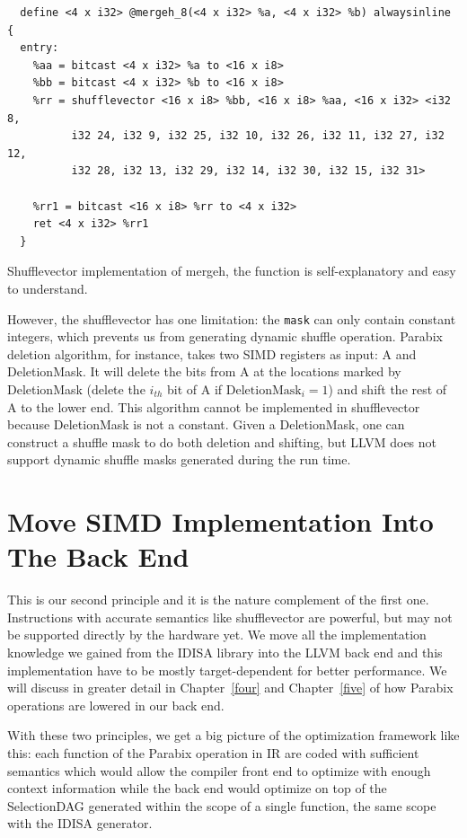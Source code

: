 \begin{program}
\begin{verbatim}
  define <4 x i32> @mergeh_8(<4 x i32> %a, <4 x i32> %b) alwaysinline {
  entry:
    %aa = bitcast <4 x i32> %a to <16 x i8>
    %bb = bitcast <4 x i32> %b to <16 x i8>
    %rr = shufflevector <16 x i8> %bb, <16 x i8> %aa, <16 x i32> <i32 8,
          i32 24, i32 9, i32 25, i32 10, i32 26, i32 11, i32 27, i32 12,
          i32 28, i32 13, i32 29, i32 14, i32 30, i32 15, i32 31>

    %rr1 = bitcast <16 x i8> %rr to <4 x i32>
    ret <4 x i32> %rr1
  }
\end{verbatim}
\caption[Shufflevector implementation of mergeh.]{Shufflevector implementation of mergeh, the function is self-explanatory and easy to understand.}
\label{program:mergeh_8}
\end{program}

However, the shufflevector has one limitation: the {\tt mask} can only contain constant integers, which prevents us from generating dynamic shuffle operation. Parabix deletion algorithm, for instance, takes two SIMD registers as input: A and DeletionMask. It will delete the bits from A at the locations marked by DeletionMask (delete the $i_{th}$ bit of A if $\text{DeletionMask}_i = 1$) and shift the rest of A to the lower end. This algorithm cannot be implemented in shufflevector because DeletionMask is not a constant. Given a DeletionMask, one can construct a shuffle mask to do both deletion and shifting, but LLVM does not support dynamic shuffle masks generated during the run time.

\section{Move SIMD Implementation Into The Back End}

This is our second principle and it is the nature complement of the first one. Instructions with accurate semantics like shufflevector are powerful, but may not be supported directly by the hardware yet. We move all the implementation knowledge we gained from the IDISA library into the LLVM back end and this implementation have to be mostly target-dependent for better performance. We will discuss in greater detail in Chapter~\ref{four} and Chapter~\ref{five} of how Parabix operations are lowered in our back end.

With these two principles, we get a big picture of the optimization framework like this: each function of the Parabix operation in IR are coded with sufficient semantics which would allow the compiler front end to optimize with enough context information while the back end would optimize on top of the SelectionDAG generated within the scope of a single function, the same scope with the IDISA generator.
